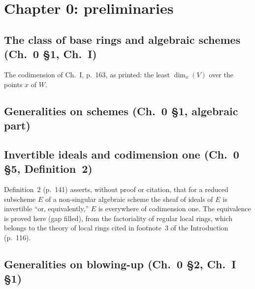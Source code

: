 \chapter{Chapter 0: preliminaries}

\section{The class of base rings and algebraic schemes (Ch.~0 \S1, Ch.~I)}

The codimension of Ch.~I, p.~163, as printed: the least $\dim_x(V)$ over the points $x$ of $W$.

\section{Generalities on schemes (Ch.~0 \S1, algebraic part)}

\section{Invertible ideals and codimension one (Ch.~0 \S5, Definition~2)}
Definition~2 (p.~141) asserts, without proof or citation, that for a reduced subscheme $E$ of a
non-singular algebraic scheme the sheaf of ideals of $E$ is invertible ``or, equivalently,'' $E$ is
everywhere of codimension one. The equivalence is proved here (gap filled), from the factoriality
of regular local rings, which belongs to the theory of local rings cited in footnote~3 of the
Introduction (p.~116).


\section{Generalities on blowing-up (Ch.~0 \S2, Ch.~I \S1)}

